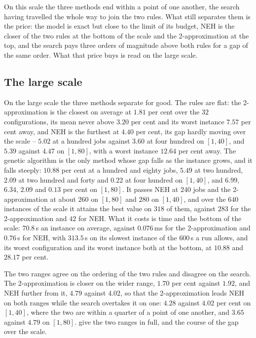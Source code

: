 \documentclass[12pt]{article}
\begin{document}
\begin{sloppypar}
        On this scale the three methods end within a point of one another, the search having travelled the
        whole way to join the two rules. What still separates them is the price: the model is exact but
        close to the limit of its budget, NEH is the closer of the two rules at the bottom of the scale
        and the 2-approximation at the top, and the search pays three orders of magnitude above both
        rules for a gap of the same order. What that price buys is read on the large scale.
        
        \subsection{The large scale}
        
        On the large scale the three methods separate for good. The rules are flat: the 2-approximation
        is the closest on average at $1.81$ per cent over the $32$ configurations, its mean never above
        $3.20$ per cent and its worst instance $7.57$ per cent away, and NEH is the furthest at $4.40$
        per cent, its gap hardly moving over the scale -- $5.02$ at a hundred jobs against $3.60$ at four
        hundred on $[1,40]$, and $5.39$ against $4.47$ on $[1,80]$, with a worst instance $12.64$ per
        cent away. The genetic algorithm is the only method whose gap falls as the instance grows, and it
        falls steeply: $10.88$ per cent at a hundred and eighty jobs, $5.49$ at two hundred, $2.09$ at
        two hundred and forty and $0.22$ at four hundred on $[1,40]$, and $6.99$, $6.34$, $2.09$ and
        $0.13$ per cent on $[1,80]$. It passes NEH at $240$ jobs and the 2-approximation at about $260$
        on $[1,80]$ and $280$ on $[1,40]$, and over the $640$ instances of the scale it attains the best
        value on $318$ of them, against $283$ for the 2-approximation and $42$ for NEH. What it costs is
        time and the bottom of the scale: $70.8$\,s an instance on average, against $0.076$\,ms for the
        2-approximation and $0.76$\,s for NEH, with $313.5$\,s on its slowest instance of the $600$\,s a
        run allows, and its worst configuration and its worst instance both at the bottom, at $10.88$ and
        $28.17$ per cent.
        
        The two ranges agree on the ordering of the two rules and disagree on the search. The
        2-approximation is closer on the wider range, $1.70$ per cent against $1.92$, and NEH further from
        it, $4.79$ against $4.02$, so that the 2-approximation leads NEH on both ranges while the search
        overtakes it on one: $4.28$ against $4.02$ per cent on $[1,40]$, where the two are within a quarter
        of a point of one another, and $3.65$ against $4.79$ on $[1,80]$.
         give the two ranges in full, and
         the course of the gap over the scale.
        

\end{sloppypar}
\end{document}
